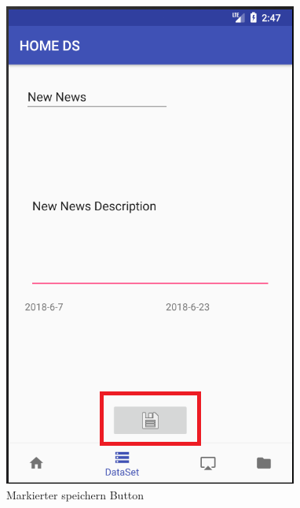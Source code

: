 \begin{figure}[H]
\centering
\includegraphics[scale=0.35]{images/06_AndroidApp/06_EditNewsSaveButton}
\caption{Markierter speichern Button}
\label{fig:mediaNav}
\end{figure}

